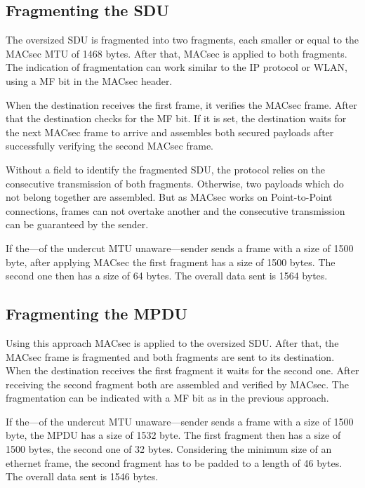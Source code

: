 \subsection{Fragmenting the \acrshort{SDU}}
The oversized \gls{SDU} is fragmented into two fragments, each smaller or equal to the \gls{MACsec} \gls{MTU} of 1468 bytes.
After that, \gls{MACsec} is applied to both fragments.
The indication of fragmentation can work similar to the \gls{IP} protocol or \gls{WLAN}, using a \acrfull{MF} bit in the \gls{MACsec} header.

When the destination receives the first frame, it verifies the \gls{MACsec} frame.
After that the destination checks for the \gls{MF} bit.
If it is set, the destination waits for the next \gls{MACsec} frame to arrive and assembles both secured payloads after successfully verifying the second \gls{MACsec} frame.

Without a field to identify the fragmented \gls{SDU}, the protocol relies on the consecutive transmission of both fragments.
Otherwise, two payloads which do not belong together are assembled.
But as \gls{MACsec} works on Point-to-Point connections, frames can not overtake another and the consecutive transmission can be guaranteed by the sender.

If the---of the undercut \gls{MTU} unaware---sender sends a frame with a size of 1500 byte, after applying \gls{MACsec} the first fragment has a size of 1500 bytes.
The second one then has a size of 64 bytes.
The overall data sent is 1564 bytes.

\subsection{Fragmenting the \acrshort{MPDU}}
Using this approach \gls{MACsec} is applied to the oversized \gls{SDU}.
After that, the \gls{MACsec} frame is fragmented and both fragments are sent to its destination.
When the destination receives the first fragment it waits for the second one.
After receiving the second fragment both are assembled and verified by \gls{MACsec}.
The fragmentation can be indicated with a \gls{MF} bit as in the previous approach.

If the---of the undercut \gls{MTU} unaware---sender sends a frame with a size of 1500 byte, the \gls{MPDU} has a size of 1532 byte.
The first fragment then has a size of 1500 bytes, the second one of 32 bytes.
Considering the minimum size of an ethernet frame, the second fragment has to be padded to a length of 46 bytes.
The overall data sent is 1546 bytes.

